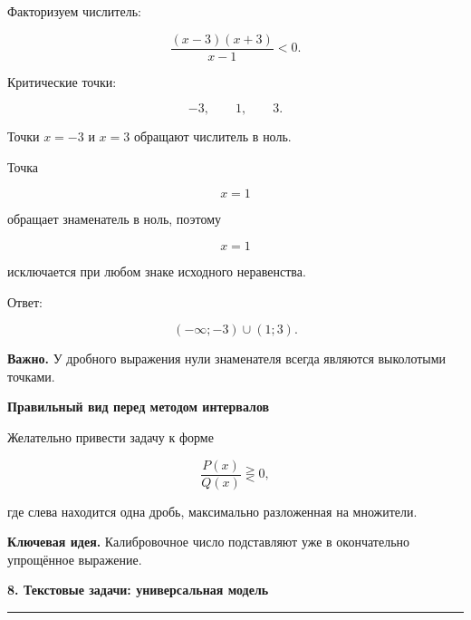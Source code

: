 \documentclass[a4paper,12pt]{article}
\newcommand{\topic}[1]{%
    \vspace{0.5em}
    {\Large\bfseries\textcolor{darkaccent}{#1}}\par
    \vspace{0.2em}
    {\color{accent}\rule{\linewidth}{0.7pt}}
    \vspace{0.5em}
}
\newcommand{\subtopic}[1]{%
    \vspace{0.5em}
    {\large\bfseries\textcolor{darkaccent}{#1}}\par
}
\newcommand{\keyidea}[1]{%
    \par\smallskip
    \textbf{\textcolor{darkaccent}{Ключевая идея.}} #1
    \par\smallskip
}
\newcommand{\warning}[1]{%
    \par\smallskip
    \textbf{\textcolor{accent}{Важно.}} #1
    \par\smallskip
}
\begin{document}
Факторизуем числитель:

\[
\frac{(x-3)(x+3)}{x-1}<0.
\]

Критические точки:

\[
-3,\qquad 1,\qquad 3.
\]

Точки \(x=-3\) и \(x=3\) обращают числитель в ноль.

Точка

\[
x=1
\]

обращает знаменатель в ноль, поэтому

\[
x=1
\]

исключается при любом знаке исходного неравенства.

\begin{center}
\end{center}

Ответ:

\[
\boxed{(-\infty;-3)\cup(1;3)}.
\]

\warning{
У дробного выражения нули знаменателя всегда являются выколотыми точками.
}

\subtopic{Правильный вид перед методом интервалов}

Желательно привести задачу к форме

\[
\frac{P(x)}{Q(x)}\gtreqless0,
\]

где слева находится одна дробь, максимально разложенная на множители.

\keyidea{
Калибровочное число подставляют уже в окончательно упрощённое выражение.
}


\topic{8. Текстовые задачи: универсальная модель}
\end{document}
